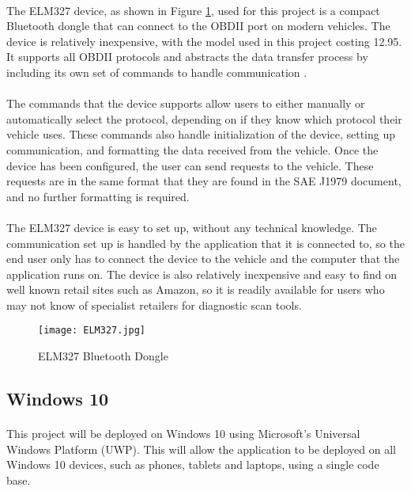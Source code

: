 		\paragraph{}{
		The ELM327 device, as shown in Figure \ref{fig:ELM327}, used for this project is a compact Bluetooth dongle that can connect to the OBDII port on modern vehicles. The device is relatively inexpensive, with the model used in this project costing {\textsterling}12.95. It supports all OBDII protocols and abstracts the data transfer process by including its own set of commands to handle communication \citep{ELM327}.				
		}
		\paragraph{}{
		The commands that the device supports allow users to either manually or automatically select the protocol, depending on if they know which protocol their vehicle uses. These commands also handle initialization of the device, setting up communication, and formatting the data received from the vehicle. Once the device has been configured, the user can send requests to the vehicle. These requests are in the same format that they are found in the SAE J1979 document, and no further formatting is required.
		}
		\paragraph{}{
		The ELM327 device is easy to set up, without any technical knowledge. The communication set up is handled by the application that it is connected to, so the end user only has to connect the device to the vehicle and the computer that the application runs on. The device is also relatively inexpensive and easy to find on well known retail sites such as Amazon, so it is readily available for users who may not know of specialist retailers for diagnostic scan tools.
		}
		\begin{figure}[h]
				\begin{center}											
					\texttt{[image: ELM327.jpg]}
					\caption{ELM327 Bluetooth Dongle}
					\label{fig:ELM327}
				\end{center}
		\end{figure}		
\newpage
	\subsection{Windows 10}
		\paragraph{}{
		This project will be deployed on Windows 10 using Microsoft's Universal Windows Platform (UWP). This will allow the application to be deployed on all Windows 10 devices, such as phones, tablets and laptops, using a single code base.
		}
